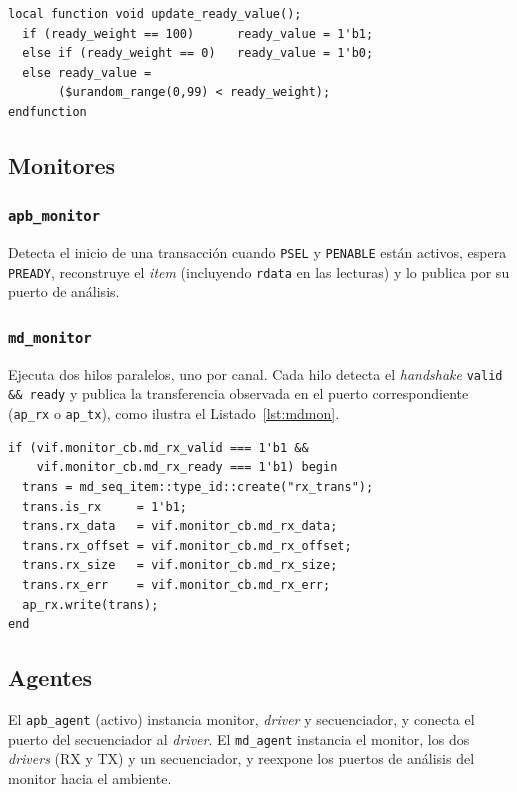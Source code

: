 \documentclass[conference]{IEEEtran}
\begin{document}
\begin{lstlisting}[caption={Contrapresión ponderada en el driver TX},label={lst:txdrv}]
local function void update_ready_value();
  if (ready_weight == 100)      ready_value = 1'b1;
  else if (ready_weight == 0)   ready_value = 1'b0;
  else ready_value =
       ($urandom_range(0,99) < ready_weight);
endfunction
\end{lstlisting}

\subsection{Monitores}
\subsubsection{\texttt{apb\_monitor}}
Detecta el inicio de una transacción cuando \texttt{PSEL} y \texttt{PENABLE}
están activos, espera \texttt{PREADY}, reconstruye el \textit{item} (incluyendo
\texttt{rdata} en las lecturas) y lo publica por su puerto de análisis.

\subsubsection{\texttt{md\_monitor}}
Ejecuta dos hilos paralelos, uno por canal. Cada hilo detecta el
\textit{handshake} \texttt{valid \&\& ready} y publica la transferencia
observada en el puerto correspondiente (\texttt{ap\_rx} o \texttt{ap\_tx}), como
ilustra el Listado~\ref{lst:mdmon}.

\begin{lstlisting}[caption={Captura del handshake en el monitor MD},label={lst:mdmon}]
if (vif.monitor_cb.md_rx_valid === 1'b1 &&
    vif.monitor_cb.md_rx_ready === 1'b1) begin
  trans = md_seq_item::type_id::create("rx_trans");
  trans.is_rx     = 1'b1;
  trans.rx_data   = vif.monitor_cb.md_rx_data;
  trans.rx_offset = vif.monitor_cb.md_rx_offset;
  trans.rx_size   = vif.monitor_cb.md_rx_size;
  trans.rx_err    = vif.monitor_cb.md_rx_err;
  ap_rx.write(trans);
end
\end{lstlisting}

\subsection{Agentes}
El \texttt{apb\_agent} (activo) instancia monitor, \textit{driver} y
secuenciador, y conecta el puerto del secuenciador al \textit{driver}. El
\texttt{md\_agent} instancia el monitor, los dos \textit{drivers} (RX y TX) y un
secuenciador, y reexpone los puertos de análisis del monitor hacia el ambiente.
\end{document}
